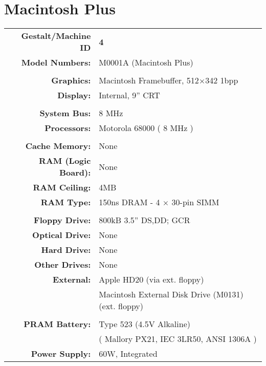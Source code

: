 
\section{Macintosh Plus}
\sectionrule

\begin{tabular}{ r p{6in} }
\textbf{Gestalt/Machine ID} & \textbf{4} \\
\textbf{Model Numbers:} & M0001A (Macintosh Plus) \\
\\
\textbf{Graphics:} & Macintosh Framebuffer, 512\(\times\)342 1bpp \\
\textbf{Display:} & Internal, 9'' CRT \\
\\
\textbf{System Bus:} & 8 MHz \\
\textbf{Processors:} & Motorola 68000 ( 8 MHz ) \\
\\
\textbf{Cache Memory:} & None \\
\textbf{RAM (Logic Board):} & None \\
\textbf{RAM Ceiling:} & 4MB \\
\textbf{RAM Type:} & 150ns DRAM - 4 \(\times\) 30-pin SIMM \\
\\
\textbf{Floppy Drive:} & 800kB 3.5'' DS,DD; GCR \\
\textbf{Optical Drive:} & None \\
\textbf{Hard Drive:} & None \\
\textbf{Other Drives:} & None \\
\textbf{External:} & Apple HD20 (via ext. floppy) \\
~ & Macintosh External Disk Drive (M0131) (ext. floppy) \\
\\
\textbf{PRAM Battery:} & Type 523 (4.5V Alkaline) \\
~ & ( Mallory PX21, IEC 3LR50, ANSI 1306A )\\
\textbf{Power Supply:} & 60W, Integrated
\\

\end{tabular}
